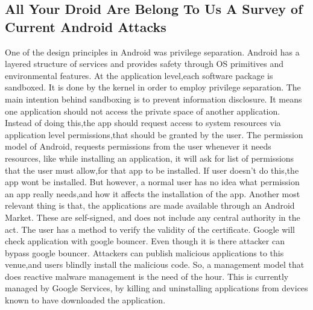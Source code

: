 %
\newpage
\subsection{All Your Droid Are Belong To Us A Survey of Current Android Attacks}

 One of the design principles in Android was privilege separation\cite{vidas2011all}. Android has a layered structure of services and provides safety through OS primitives and environmental features. At the application level,each software package is sandboxed. It is done by the kernel in order to employ privilege separation. The main intention behind sandboxing is to prevent information disclosure. It means one application should not access the private space of another application. Instead of doing this,the app should request access to system resources via application level permissions,that should be granted by the user. The permission model of Android, requests permissions from the user whenever it needs resources, like while installing an application, it will ask for list of permissions that the user must allow,for that app to be installed. If user doesn't do this,the app wont be installed. But however, a normal user has no idea what permission an app really needs,and how it affects the installation of the app. 
 Another most relevant thing is that, the applications are made available through an Android Market. These are self-signed, and does not include any central authority in the act.  The user has a method to verify the validity of the certificate. Google will check application with google bouncer. Even though it is there attacker can bypass google bouncer. Attackers can publish malicious applications to this venue,and users blindly install the malicious code. So, a management model that does reactive malware management is the need of the hour. This is currently managed by Google Services, by killing and uninstalling applications from devices known to have downloaded the application. 
 
